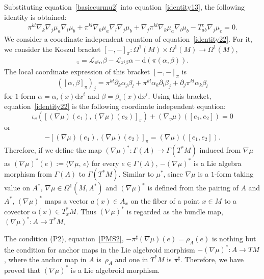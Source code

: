 \documentclass[pdftex]{sigma}
\numberwithin{equation}{section}
\newcommand{\calL}{{\mathcal L}}
\newcommand{\rhoa}{{\rho_A}}
\newcommand{\bracket}[2]{\langle #1,\,#2\rangle}
\newcommand{\rd}{\mathrm{d}}
\begin{document}
Substituting equation~\eqref{basiccurmu2} into equation~\eqref{identity13},
the following identity is obtained:
\begin{gather}
 \pi^{kl} \nabla_k \nabla_j \mu_a \nabla_l \mu_b
+ \pi^{kl} \nabla_k \mu_a \nabla_l \nabla_j \mu_b
+ \nabla_j \pi^{kl} \nabla_k \mu_a \nabla_l \mu_b
- T_{ab}^c \nabla_j \mu_c =0.
\label{identity22}
\end{gather}
We consider a coordinate independent equation of equation~\eqref{identity22}.
For it, we consider
the Koszul bracket $[-,-]_{\pi}\colon\Omega^1(M) \times \Omega^1(M)
\rightarrow \Omega^1(M)$,
\begin{gather}
[\alpha, \beta]_{\pi} =
\calL_{\pi^{\sharp} \alpha} \beta - \calL_{\pi^{\sharp} \beta} \alpha
- \rd (\pi(\alpha, \beta)).
\label{Koszulbracket}
\end{gather}
The local coordinate expression of this bracket $[-, -]_{\pi}$ is
\[
([\alpha, \beta]_{\pi})_j
=
\pi^{kl} \partial_k \alpha_j \beta_l
+ \pi^{kl} \alpha_k \partial_l \beta_j
+ \partial_j \pi^{kl} \alpha_k \beta_l
\]
for $1$-form $\alpha = \alpha_i(x) \rd x^i$ and $\beta = \beta_i(x) \rd x^i$.
Using this bracket, equation~\eqref{identity22} is
the following coordinate independent equation:
\[
\iota_v ([(\nabla \mu)(e_1), (\nabla \mu)(e_2)]_{\pi}{})
+ (\nabla_{v} \mu)([e_1, e_2])
=0
\]
or
\begin{gather}
- [(\nabla \mu)(e_1), (\nabla \mu)(e_2)]_{\pi}
= (\nabla \mu)([e_1, e_2]).
\label{identity34}
\end{gather}
Therefore, if we define the map $(\nabla \mu)^*\colon \Gamma(A) \rightarrow \Gamma(T^*M)$ induced from $\nabla \mu$ as
$(\nabla \mu)^*(e) := \bracket{\nabla \mu}{e}$ for every $e \in \Gamma(A)$,
$-(\nabla \mu)^*$ is a Lie algebra morphism from $\Gamma(A)$ to $\Gamma(T^*M)$.
Similar to $\mu^*$,
since $\nabla \mu$ is a $1$-form taking value on $A^*$,
$\nabla \mu \in \Omega^1(M, A^*)$ and $(\nabla \mu)^*$ is defined from
the pairing of $A$ and $A^*$, $(\nabla \mu)^*$ maps a vector
$a(x) \in A_x$ on the fiber of a point $x \in M$ to a covector
$\alpha(x) \in T^*_x M$. Thus $(\nabla \mu)^*$ is regarded as
the bundle map, $(\nabla \mu)^*\colon A \rightarrow T^*M$.


The condition (P2), equation~\eqref{PMS2},
$- \pi^{\sharp} (\nabla \mu)(e) = \rhoa(e)$
is nothing but the condition for anchor maps in the Lie algebroid morphism
$-(\nabla \mu)^*\colon A \rightarrow TM$,
where the anchor map in $A$ is~$\rhoa$ and one in $T^*M$ is $\pi^{\sharp}$.
Therefore, we have proved that $(\nabla \mu)^*$ is a Lie algebroid morphism.
\end{document}
